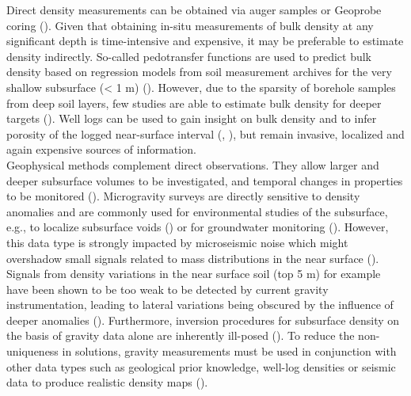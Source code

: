 \documentclass[]{article}
\begin{document}
	Direct density measurements can be obtained via auger samples or Geoprobe coring (\cite{holbrook2014geophysical}). Given that obtaining in-situ measurements of bulk density at any significant depth is time-intensive and expensive, it may be preferable to estimate density indirectly. So-called pedotransfer functions are used to predict bulk density based on regression models from soil measurement archives for the very shallow subsurface (< 1 m) (\cite{suuster2011soil}). However, due to the sparsity of borehole samples from deep soil layers, few studies are able to estimate bulk density for deeper targets (\cite{qiao2019development}). Well logs can be used to gain insight on bulk density and to infer porosity of the logged near-surface interval (\cite{FANCHI2010109}, \cite{holbrook2019links}), but remain invasive, localized and again expensive sources of information.\\
	
	 Geophysical methods complement direct observations. They allow larger and deeper subsurface volumes to be investigated, and temporal changes in properties to be monitored (\cite{parsekian2015multiscale}).  Microgravity surveys are directly sensitive to density anomalies and are commonly used for environmental studies of the subsurface, e.g., to localize subsurface voids (\cite{tuckwell2008use}) or for groundwater monitoring (\cite{piccolroaz2015use}). However, this data type is strongly impacted by microseismic noise which might overshadow small signals related to mass distributions in the near surface (\cite{boddice2022microgravity}). Signals from density variations in the near surface soil (top 5 m) for example have been shown to be too weak to be detected by current gravity instrumentation, leading to lateral variations being obscured by the influence of deeper anomalies (\cite{boddice2019quantifying}). Furthermore, inversion procedures for subsurface density on the basis of gravity data alone are inherently ill-posed (\cite{blom2017synthetic}). To reduce the non-uniqueness in solutions, gravity measurements must be used in conjunction with other data types such as geological prior knowledge, well-log densities or seismic data to produce realistic density maps (\cite{nabighian2005historical}). \\ %
	
\end{document}
